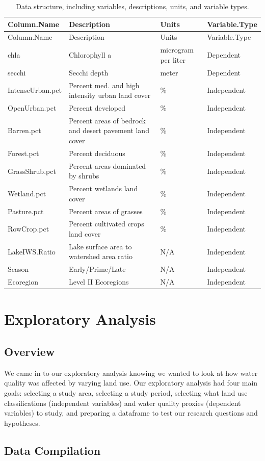 \documentclass[12pt,]{article}
\begin{document}
\begin{longtable}[]{@{}llll@{}}
\caption{Data structure, including variables, descriptions, units, and
variable types.}\tabularnewline
\toprule
Column.Name & Description & Units & Variable.Type\tabularnewline
\midrule
\endfirsthead
\toprule
Column.Name & Description & Units & Variable.Type\tabularnewline
\midrule
\endhead
chla & Chlorophyll a & microgram per liter & Dependent\tabularnewline
secchi & Secchi depth & meter & Dependent\tabularnewline
IntenseUrban.pct & Percent med. and high intensity urban land cover & \%
& Independent\tabularnewline
OpenUrban.pct & Percent developed & \% & Independent\tabularnewline
Barren.pct & Percent areas of bedrock and desert pavement land cover &
\% & Independent\tabularnewline
Forest.pct & Percent deciduous & \% & Independent\tabularnewline
GrassShrub.pct & Percent areas dominated by shrubs & \% &
Independent\tabularnewline
Wetland.pct & Percent wetlands land cover & \% &
Independent\tabularnewline
Pasture.pct & Percent areas of grasses & \% & Independent\tabularnewline
RowCrop.pct & Percent cultivated crops land cover & \% &
Independent\tabularnewline
LakeIWS.Ratio & Lake surface area to watershed area ratio & N/A &
Independent\tabularnewline
Season & Early/Prime/Late & N/A & Independent\tabularnewline
Ecoregion & Level II Ecoregions & N/A & Independent\tabularnewline
\bottomrule
\end{longtable}

\newpage

\hypertarget{exploratory-analysis}{%
\section{Exploratory Analysis}\label{exploratory-analysis}}

\hypertarget{overview}{%
\subsection{Overview}\label{overview}}

We came in to our exploratory analysis knowing we wanted to look at how
water quality was affected by varying land use. Our exploratory analysis
had four main goals: selecting a study area, selecting a study period,
selecting what land use classifications (independent variables) and
water quality proxies (dependent variables) to study, and preparing a
dataframe to test our research questions and hypotheses.

\hypertarget{data-compilation}{%
\subsection{Data Compilation}\label{data-compilation}}
\end{document}
